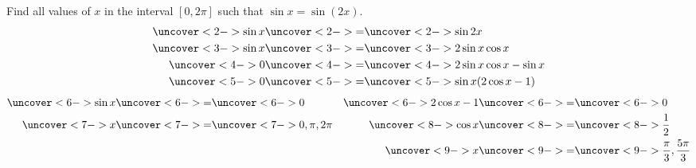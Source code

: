 \begin{frame}
\begin{example}
Find all values of $x$ in the interval $[0, 2\pi ]$ such that $\sin x = \sin (2x) $.
\abovedisplayskip=0pt
\belowdisplayskip=0pt
\abovedisplayshortskip=0pt
\belowdisplayshortskip=0pt
\begin{align*}
\uncover<2->{\sin x} & \uncover<2->{=}  \uncover<2->{\sin 2x}\\
\uncover<3->{\sin x} & \uncover<3->{=}  \uncover<3->{2\sin x \cos x}\\
\uncover<4->{0} & \uncover<4->{=}  \uncover<4->{2\sin x \cos x - \sin x}\\
\uncover<5->{0} & \uncover<5->{=}  \uncover<5->{\sin x (2 \cos x - 1)}
\end{align*}
\abovedisplayskip=0pt
\belowdisplayskip=0pt
\abovedisplayshortskip=0pt
\belowdisplayshortskip=0pt
\begin{align*}
\uncover<6->{\sin x} & \uncover<6->{=}  \uncover<6->{0} & \uncover<6->{ 2\cos x - 1} & \uncover<6->{=}  \uncover<6->{0}\\
\uncover<7->{ x} & \uncover<7->{=}  \uncover<7->{0, \pi , 2\pi} & \uncover<8->{\cos x} & \uncover<8->{=}  \uncover<8->{\frac{1}{2}}\\
& & \uncover<9->{ x} & \uncover<9->{=}  \uncover<9->{\frac{\pi}{3}, \frac{5\pi}{3}}
\end{align*}
\end{example}
\end{frame}
